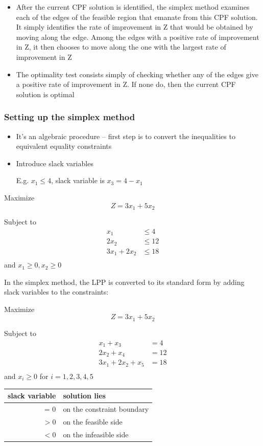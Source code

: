 \documentclass[12pt]{article}
\begin{document}
\begin{itemize}
\item After the current CPF solution is identified, the simplex
method examines each of the edges of the feasible region that emanate from this
CPF solution. 
It simply identifies the rate of improvement in Z that would
be obtained by moving along the edge. Among the edges with a positive rate of
improvement in Z, it then chooses to move along the one with the largest rate of
improvement in Z
\item The optimality test consists simply of checking whether
any of the edges give a positive rate of improvement in Z. If none do, then the
current CPF solution is optimal
\end{itemize}




\subsubsection*{Setting up the simplex method}
\begin{itemize}
\item It's an algebraic procedure -- first step is to convert the inequalities to equivalent equality constraints
\item Introduce slack variables

E.g. $x_1 \le 4$, slack variable is $x_3 = 4 - x_1 $
\end{itemize}

Maximize $$Z=3 x_1 + 5 x_2$$

Subject to 
\begin{align*}
x_1           & \le 4  \\
2 x_2         & \le 12 \\
3 x_1 + 2 x_2 & \le 18 \\
\end{align*}
and 
$x_1 \ge 0, x_2 \ge 0$

In the simplex method, the LPP is converted to its standard form by adding slack variables to the constraints:

Maximize $$Z=3 x_1 + 5 x_2$$

Subject to 
\begin{align*}
x_1 +x_3& = 4   \\
2 x_2 +x_4& = 12 \\
3 x_1 + 2 x_2+x_5 & = 18 \\
\end{align*}
and 
$x_i \ge 0$ for $i=1,2,3,4,5$

\begin{tabular}{|r|l|}
  slack variable & solution lies              \\ \hline
  = 0            & on the constraint boundary \\
  $>0$           & on the feasible side       \\ 
  $<0$           & on the infeasible side
\end{tabular}
\end{document}
